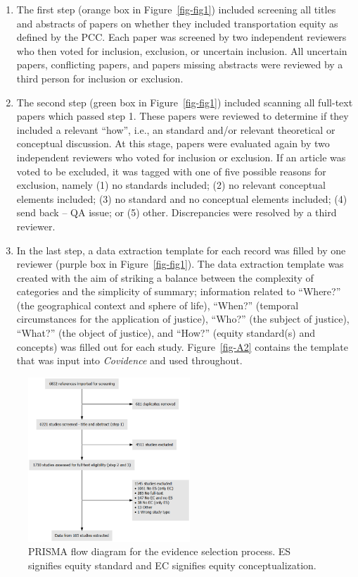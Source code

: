 \documentclass[12pt, oneside]{report}
\begin{document}
\begin{enumerate}
\def\labelenumi{\arabic{enumi}.}
\item
  The first step (orange box in Figure~\ref{fig-fig1}) included
  screening all titles and abstracts of papers on whether they included
  transportation equity as defined by the PCC. Each paper was screened
  by two independent reviewers who then voted for inclusion, exclusion,
  or uncertain inclusion. All uncertain papers, conflicting papers, and
  papers missing abstracts were reviewed by a third person for inclusion
  or exclusion.
\item
  The second step (green box in Figure~\ref{fig-fig1}) included scanning
  all full-text papers which passed step 1. These papers were reviewed
  to determine if they included a relevant ``how'', i.e., an standard
  and/or relevant theoretical or conceptual discussion. At this stage,
  papers were evaluated again by two independent reviewers who voted for
  inclusion or exclusion. If an article was voted to be excluded, it was
  tagged with one of five possible reasons for exclusion, namely (1) no
  standards included; (2) no relevant conceptual elements included; (3)
  no standard and no conceptual elements included; (4) send back -- QA
  issue; or (5) other. Discrepancies were resolved by a third reviewer.
\item
  In the last step, a data extraction template for each record was
  filled by one reviewer (purple box in Figure~\ref{fig-fig1}). The data
  extraction template was created with the aim of striking a balance
  between the complexity of categories and the simplicity of summary;
  information related to ``Where?'' (the geographical context and sphere
  of life), ``When?'' (temporal circumstances for the application of
  justice), ``Who?'' (the subject of justice), ``What?'' (the object of
  justice), and ``How?'' (equity standard(s) and concepts) was filled
  out for each study. Figure~\ref{fig-A2} contains the template that was
  input into \emph{Covidence} and used throughout.
\end{enumerate}

\begin{figure}

{\centering \includegraphics[width=2.4in,height=\textheight]{figures/Pflow_chart.png}

}

\caption{\label{fig-fig2}PRISMA flow diagram for the evidence selection
process. ES signifies equity standard and EC signifies equity
conceptualization.}

\end{figure}
\end{document}
